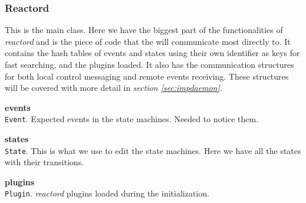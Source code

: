 \subsubsection{Reactord}
This is the main class. Here we have the biggest part of the functionalities of \emph{reactord} and is the piece of code that the will
communicate most directly to. It contains the hash tables of events and states using their own identifier as keys for fast searching, and
the plugins loaded.
It also has the communication structures for both local control messaging and remote events receiving. These structures will be covered
with more detail in \emph{section \ref{sec:impdaemon}}.\\
\begin{list}{-}{The attributes are:}
  \item {\bf events}\\
    \texttt{Event}. Expected events in the state machines. Needed to notice them.
  \item {\bf states}\\
    \texttt{State}. This is what we use to edit the state machines. Here we have all the states with their transitions.
  \item {\bf plugins}\\
    \texttt{Plugin}. \emph{reactord} plugins loaded during the initialization.
\end{list}
\
